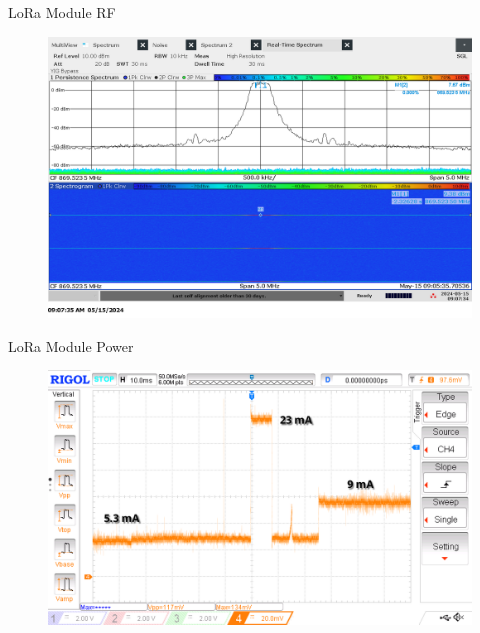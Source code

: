 \documentclass[hyphens]{beamer}
\begin{document}
\begin{frame}{LoRa Module RF}
\begin{figure}
    \centering
    \includegraphics[width=\linewidth]{../thesis/fig/rf-transmit-250khz.png}
\end{figure}
\end{frame}

\begin{frame}{LoRa Module Power}
\begin{figure}
    \centering
    \includegraphics[width=\linewidth]{../thesis/fig/module-current-tx-inv.png}
\end{figure}
\end{frame}
\end{document}
